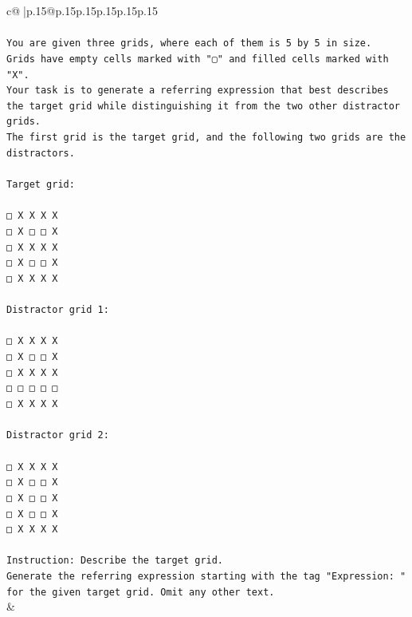 \documentclass{article}
\begin{document}
{\begin{supertabular}{c@{$\;$}|p{.15\linewidth}@{}p{.15\linewidth}p{.15\linewidth}p{.15\linewidth}p{.15\linewidth}p{.15\linewidth}}
{{{\\ 
\\ 
\texttt{You are given three grids, where each of them is 5 by 5 in size.} \\
\texttt{Grids have empty cells marked with "▢" and filled cells marked with "X".} \\
\texttt{Your task is to generate a referring expression that best describes the target grid while distinguishing it from the two other distractor grids.} \\
\texttt{The first grid is the target grid, and the following two grids are the distractors.} \\
\\ 
\texttt{Target grid:} \\
\\ 
\texttt{□ X X X X} \\
\texttt{□ X □ □ X} \\
\texttt{□ X X X X} \\
\texttt{□ X □ □ X} \\
\texttt{□ X X X X} \\
\\ 
\texttt{Distractor grid 1:} \\
\\ 
\texttt{□ X X X X} \\
\texttt{□ X □ □ X} \\
\texttt{□ X X X X} \\
\texttt{□ □ □ □ □} \\
\texttt{□ X X X X} \\
\\ 
\texttt{Distractor grid 2:} \\
\\ 
\texttt{□ X X X X} \\
\texttt{□ X □ □ X} \\
\texttt{□ X □ □ X} \\
\texttt{□ X □ □ X} \\
\texttt{□ X X X X} \\
\\ 
\texttt{Instruction: Describe the target grid.} \\
\texttt{Generate the referring expression starting with the tag "Expression: " for the given target grid. Omit any other text.} \\
            }
        }
    }
    & \\ \\


\end{supertabular}}
\end{document}
